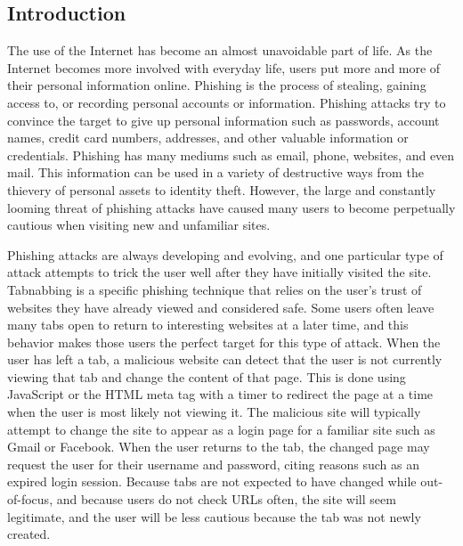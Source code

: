 \documentclass[12pt]{article}
\begin{document}
\begin{doublespace}

\section{Introduction}
The use of the Internet has become an almost unavoidable part of life. As the Internet becomes more involved with everyday life, users put more and more of their personal information online. Phishing is the process of stealing, gaining access to, or recording personal accounts or information. Phishing attacks try to convince the target to give up personal information such as passwords, account names, credit card numbers, addresses, and other valuable information or credentials. Phishing has many mediums such as email, phone, websites, and even mail. This information can be used in a variety of destructive ways from the thievery of personal assets to identity theft.  However, the large and constantly looming threat of phishing attacks have caused many users to become perpetually cautious when visiting new and unfamiliar sites.

Phishing attacks are always developing and evolving, and one particular type of attack attempts to trick the user well after they have initially visited the site.  Tabnabbing is a specific phishing technique that relies on the user’s trust of websites they have already viewed and considered safe. Some users often leave many tabs open to return to interesting websites at a later time, and this behavior makes those users the perfect target for this type of attack. When the user has left a tab, a malicious website can detect that the user is not currently viewing that tab and change the content of that page. This is done using JavaScript or the HTML meta tag with a timer to redirect the page at a time when the user is most likely not viewing it. The malicious site will typically attempt to change the site to appear as a login page for a familiar site such as Gmail or Facebook.  When the user returns to the tab, the changed page may request the user for their username and password, citing reasons such as an expired login session.  Because tabs are not expected to have changed while out-of-focus, and because users do not check URLs often, the site will seem legitimate, and the user will be less cautious because the tab was not newly created.



\begin{comment}


\end{comment}
\end{doublespace}
\end{document}
